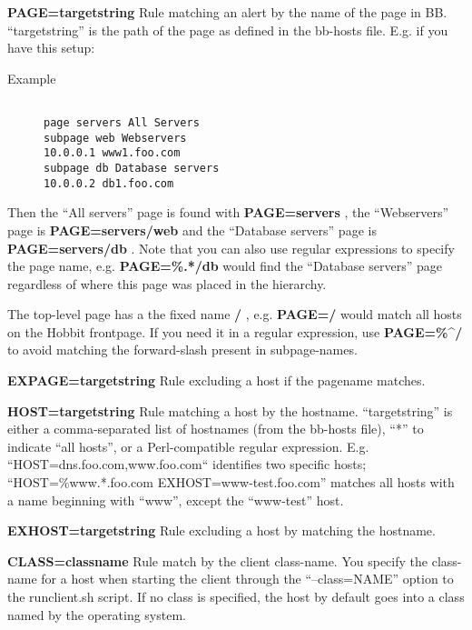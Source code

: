  \textbf{PAGE=targetstring}
 Rule matching an alert by the name of the page in
 BB. ``targetstring'' is the path of the page as defined in the
 bb-hosts file. E.g. if you have this setup: 

\begin{description}

\item[Example]
\begin{verbatim}

page servers All Servers
subpage web Webservers
10.0.0.1 www1.foo.com
subpage db Database servers
10.0.0.2 db1.foo.com

\end{verbatim}


\end{description}



  Then the ``All servers'' page is found with \textbf{PAGE=servers}
, the ``Webservers'' page is \textbf{PAGE=servers/web}
 and the ``Database servers'' page is \textbf{PAGE=servers/db}
. Note that you can also use regular expressions to specify the page name, e.g. \textbf{PAGE=\%.*/db}
 would find the ``Database servers'' page regardless of where this page was placed in the hierarchy. 


  The top-level page has a the fixed name \textbf{/}
, e.g. \textbf{PAGE=/} would match all hosts on the Hobbit
  frontpage. If you need it in a regular expression, use
  \textbf{PAGE=\%\^{}/} to avoid matching the forward-slash present in
  subpage-names. 



 \textbf{EXPAGE=targetstring}
 Rule excluding a host if the pagename matches. 


 \textbf{HOST=targetstring}
 Rule matching a host by the hostname. ``targetstring'' is either a
 comma-separated list of hostnames (from the bb-hosts file), ``*'' to
 indicate ``all hosts'', or a Perl-compatible regular
 expression. E.g. ``HOST=dns.foo.com,www.foo.com`` identifies two
 specific hosts; ``HOST=\%www.*.foo.com EXHOST=www-test.foo.com''
 matches all hosts with a name beginning with ``www'', except the
 ``www-test'' host. 



 \textbf{EXHOST=targetstring}
 Rule excluding a host by matching the hostname. 


 \textbf{CLASS=classname}
 Rule match by the client class-name. You specify the class-name for a
 host when starting the client through the ``--class=NAME'' option to
 the runclient.sh script. If no class is specified, the host by
 default goes into a class named by the operating system. 




